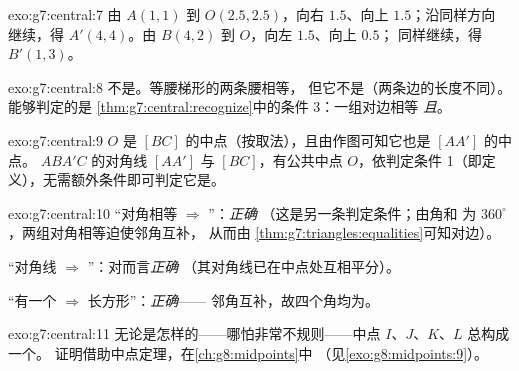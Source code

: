 \begin{solution}{exo:g7:central:7}
由 $A(1,1)$ 到 $O(2.5, 2.5)$，向右 $1.5$、向上 $1.5$；沿同样方向
继续，得 $A'(4, 4)$。由 $B(4,2)$ 到 $O$，向左 $1.5$、向上 $0.5$；
同样继续，得 $B'(1, 3)$。
\end{solution}

\begin{solution}{exo:g7:central:8}
不是。等腰梯形的两条腰相等，
但它不是（两条边的长度不同）。
能够判定的是
\cref{thm:g7:central:recognize}中的条件 3：一组对边相等
\emph{且}。
\end{solution}

\begin{solution}{exo:g7:central:9}
$O$ 是 $[BC]$ 的中点（按取法），且由作图可知它也是
$[AA']$ 的中点。 $ABA'C$
的对角线 $[AA']$ 与 $[BC]$，有公共中点 $O$，依判定条件
1（即定义），无需额外条件即可判定它是。
\end{solution}

\begin{solution}{exo:g7:central:10}
“对角相等 $\Rightarrow$ ”：\emph{正确}
（这是另一条判定条件；由角和
为 $360^\circ$，两组对角相等迫使邻角互补，
从而由
\cref{thm:g7:triangles:equalities}可知对边）。

“对角线 $\Rightarrow$ ”：对而言\emph{正确}
（其对角线已在中点处互相平分）。

“有一个 $\Rightarrow$ 长方形”：\emph{正确}——
邻角互补，故四个角均为。
\end{solution}

\begin{solution}{exo:g7:central:11}
无论是怎样的——哪怕非常不规则——中点
$I$、$J$、$K$、$L$ 总构成一个\emph{}。
证明借助中点定理，在\cref{ch:g8:midpoints}中
（见\cref{exo:g8:midpoints:9}）。
\end{solution}

